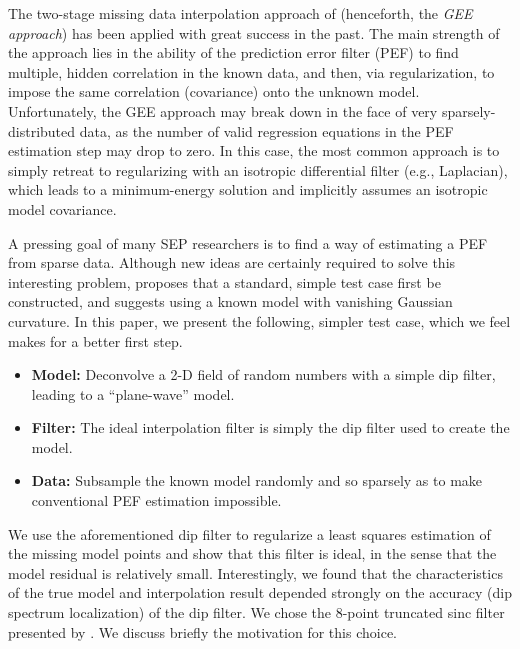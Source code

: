 The two-stage missing data interpolation approach of  (henceforth, the {\em GEE 
approach}) has been applied
with great success \cite{Fomel.sep.95.sergey1,Clapp.sep.97.bob1,Crawley.sep.104} in the past.  
The main strength of the approach lies in the ability of the prediction error filter (PEF) to 
find multiple, hidden correlation in the known data, and then, via regularization, to impose
the same correlation (covariance) onto the unknown model.
Unfortunately, the GEE approach may break down
in the face of very sparsely-distributed data, as the number of valid regression equations
in the PEF estimation step may drop to zero.  
In this case, the most common approach is to simply retreat to regularizing with an isotropic 
differential filter (e.g., Laplacian), which leads to a 
minimum-energy solution and implicitly assumes an isotropic model covariance.
\par
A pressing goal of many SEP researchers is to find a way of estimating a PEF from sparse
data.  Although new ideas are certainly required to solve this 
interesting problem,  proposes that a standard, simple test 
case first be constructed, and suggests using a known model with vanishing
Gaussian curvature.  In this paper, we present the following, simpler test case, which we
feel makes for a better first step.
\begin{itemize}
	\item {\bf Model:} Deconvolve a 2-D field of random numbers with a simple dip filter, 
	                   leading to a ``plane-wave'' model.
	\item {\bf Filter:} The ideal interpolation filter is simply the dip filter used to 
	                    create the model.
	\item {\bf Data:} Subsample the known model randomly and so sparsely as to make 
	                  conventional PEF estimation impossible.
\end{itemize}
\par
We use the aforementioned dip filter to regularize a least squares estimation of the
missing model points and show that this filter is ideal, in the sense that the
model residual is relatively small.  Interestingly, we found that the characteristics
of the true model and interpolation result depended strongly on the accuracy (dip
spectrum localization) of the dip filter.  We chose the 8-point truncated sinc filter
presented by .  We discuss briefly the motivation for
this choice.

